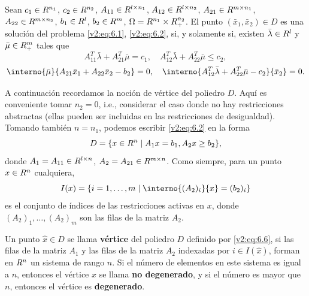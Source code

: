 \begin{theorem}\label{v2:thm:6.1.2}
    Sean $c_1 \in R^{n_1}$, $c_2 \in R^{n_2}$, $A_{11} \in R^{l \times n_1}$, $A_{12} \in R^{l \times n_2}$, $A_{21} \in R^{m \times n_1}$, $A_{22} \in R^{m \times n_2}$, $b_1 \in R^l$, $b_2 \in R^m$, $\Omega = R^{n_1} \times R^{n_2}_+$.
    El punto $(\bar{x}_1, \bar{x}_2) \in D$ es una solución del problema \eqref{v2:eq:6.1}, \eqref{v2:eq:6.2}, si, y solamente si, existen $\bar{\lambda} \in R^l$ y $\bar{\mu} \in R^m_+$ tales que
    \begin{equation}
        A_{11}^T \bar{\lambda} + A_{21}^T \bar{\mu} = c_1, \quad A_{12}^T \bar{\lambda} + A_{22}^T \bar{\mu} \le c_2,
        \label{v2:eq:6.4}
    \end{equation}
    \begin{equation}
        \interno{\bar{\mu}}{A_{21}\bar{x}_1 + A_{22}\bar{x}_2 - b_2} = 0, \quad \interno{A_{12}^T \bar{\lambda} + A_{22}^T \bar{\mu} - c_2}{\bar{x}_2} = 0.
        \label{v2:eq:6.5}
    \end{equation}
\end{theorem}

A continuación recordamos la noción de vértice del poliedro $D$. Aquí es conveniente tomar $n_2 = 0$, i.e., considerar el caso donde no hay restricciones abstractas (ellas pueden ser incluidas en las restricciones de desigualdad). Tomando también $n = n_1$, podemos escribir \eqref{v2:eq:6.2} en la forma
\begin{equation}
    D = \{ x \in R^n \mid A_1 x = b_1, A_2 x \ge b_2 \},
    \label{v2:eq:6.6}
\end{equation}
donde $A_1 = A_{11} \in R^{l \times n}$, $A_2 = A_{21} \in R^{m \times n}$. Como siempre, para un punto $x \in R^n$ cualquiera,
\[
    I(x) = \{ i = 1, \dots, m \mid \interno{(A_2)_i}{x} = (b_2)_i \}
\]
es el conjunto de índices de las restricciones activas en $x$, donde $(A_2)_1, \dots, (A_2)_m$ son las filas de la matriz $A_2$.

\begin{definition}[Vértice]\label{v2:def:6.1.1}
    Un punto $\hat{x} \in D$ se llama \textbf{vértice} del poliedro $D$ definido por \eqref{v2:eq:6.6}, si las filas de la matriz $A_1$ y las filas de la matriz $A_2$ indexadas por $i \in I(\hat{x})$, forman en $R^n$ un sistema de rango $n$. Si el número de elementos en este sistema es igual a $n$, entonces el vértice $\hat{x}$ se llama \textbf{no degenerado}, y si el número es mayor que $n$, entonces el vértice es \textbf{degenerado}.
\end{definition}

